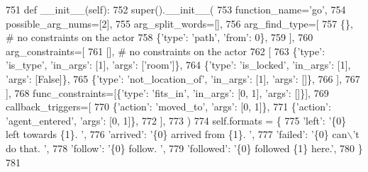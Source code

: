 \begin{DoxyCode}
751     \textcolor{keyword}{def }\_\_init\_\_(self):
752         super().\_\_init\_\_(
753             function\_name=\textcolor{stringliteral}{'go'},
754             possible\_arg\_nums=[2],
755             arg\_split\_words=[],
756             arg\_find\_type=[
757                 \{\},  \textcolor{comment}{# no constraints on the actor}
758                 \{\textcolor{stringliteral}{'type'}: \textcolor{stringliteral}{'path'}, \textcolor{stringliteral}{'from'}: 0\},
759             ],
760             arg\_constraints=[
761                 [],  \textcolor{comment}{# no constraints on the actor}
762                 [
763                     \{\textcolor{stringliteral}{'type'}: \textcolor{stringliteral}{'is\_type'}, \textcolor{stringliteral}{'in\_args'}: [1], \textcolor{stringliteral}{'args'}: [\textcolor{stringliteral}{'room'}]\},
764                     \{\textcolor{stringliteral}{'type'}: \textcolor{stringliteral}{'is\_locked'}, \textcolor{stringliteral}{'in\_args'}: [1], \textcolor{stringliteral}{'args'}: [\textcolor{keyword}{False}]\},
765                     \{\textcolor{stringliteral}{'type'}: \textcolor{stringliteral}{'not\_location\_of'}, \textcolor{stringliteral}{'in\_args'}: [1], \textcolor{stringliteral}{'args'}: []\},
766                 ],
767             ],
768             func\_constraints=[\{\textcolor{stringliteral}{'type'}: \textcolor{stringliteral}{'fits\_in'}, \textcolor{stringliteral}{'in\_args'}: [0, 1], \textcolor{stringliteral}{'args'}: []\}],
769             callback\_triggers=[
770                 \{\textcolor{stringliteral}{'action'}: \textcolor{stringliteral}{'moved\_to'}, \textcolor{stringliteral}{'args'}: [0, 1]\},
771                 \{\textcolor{stringliteral}{'action'}: \textcolor{stringliteral}{'agent\_entered'}, \textcolor{stringliteral}{'args'}: [0, 1]\},
772             ],
773         )
774         self.formats = \{
775             \textcolor{stringliteral}{'left'}: \textcolor{stringliteral}{'\{0\} left towards \{1\}. '},
776             \textcolor{stringliteral}{'arrived'}: \textcolor{stringliteral}{'\{0\} arrived from \{1\}. '},
777             \textcolor{stringliteral}{'failed'}: \textcolor{stringliteral}{'\{0\} can\(\backslash\)'t do that. '},
778             \textcolor{stringliteral}{'follow'}: \textcolor{stringliteral}{'\{0\} follow. '},
779             \textcolor{stringliteral}{'followed'}: \textcolor{stringliteral}{'\{0\} followed \{1\} here.'},
780         \}
781 
\end{DoxyCode}


